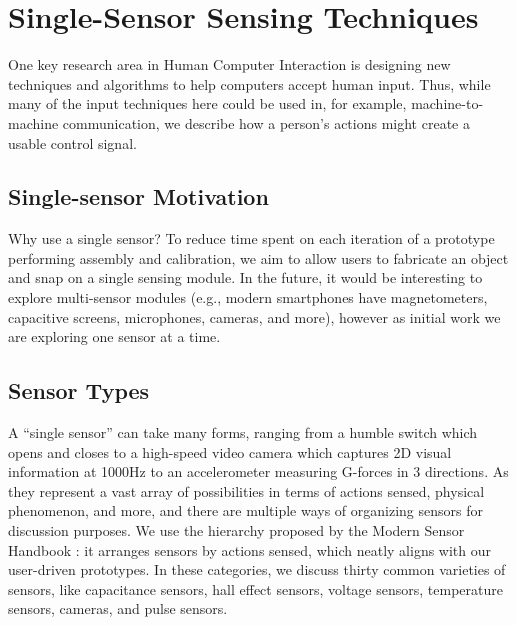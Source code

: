 \section{Single-Sensor Sensing Techniques}

One key research area in Human Computer Interaction is designing new techniques and algorithms to help computers accept human input. Thus, while many of the input techniques here could be used in, for example, machine-to-machine communication, we describe how a person's actions might create a usable control signal.

\subsection{Single-sensor Motivation}

Why use a single sensor? To reduce time spent on each iteration of a prototype performing assembly and calibration, we aim to allow users to fabricate an object and snap on a single sensing module. In the future, it would be interesting to explore multi-sensor modules (e.g., modern smartphones have magnetometers, capacitive screens, microphones, cameras, and more), however as initial work we are exploring one sensor at a time.

\subsection{Sensor Types}

A ``single sensor'' can take many forms, ranging from a humble switch which opens and closes to a high-speed video camera which captures 2D visual information at 1000Hz to an accelerometer measuring G-forces in 3 directions.
As they represent a vast array of possibilities in terms of actions sensed, physical phenomenon, and more, and there are multiple ways of organizing sensors for discussion purposes. We use the hierarchy proposed by the Modern Sensor Handbook \cite{citation needed!}: it arranges sensors by actions sensed, which neatly aligns with our user-driven prototypes. In these categories, we discuss thirty common varieties of sensors, like capacitance sensors, hall effect sensors, voltage sensors, temperature sensors, cameras, and pulse sensors.

